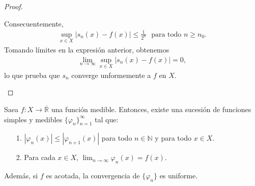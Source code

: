 \begin{proof}
\begin{enumerate}
              Consecuentemente,
              \begin{align*}
                  \sup_{x \in X}{|s_n(x) - f(x)|} \leq \frac{1}{2^n} \ \ \ \text{para todo } n \ge n_0.
              \end{align*}
              Tomando límites en la expresión anterior, obtenemos
              \begin{align*}
                  \lim_{n \to \infty}{\sup_{x \in X}{|s_n(x) - f(x)|}} = 0,
              \end{align*}
              lo que prueba que $s_n$ converge unformemente a $f$ en $X$.
    \end{enumerate}
\end{proof}

\begin{cor}
    Saea $f : X \longrightarrow \overline{\mathbb{R}}$ una función medible. Entonces, existe una sucesión de funciones simples y medibles $\{ \varphi_n\}_{n=1}^{\infty}$ tal que:
    \begin{enumerate}
        \item[1.] $|\varphi_n(x)| \leq |\varphi_{n+1}(x)|$ para todo $n \in \mathbb{N}$ y para todo $x \in X$.
        \item[2.] Para cada $x \in X$, $\lim_{n \to \infty}{\varphi_n(x)} = f(x)$.
    \end{enumerate}
    Además, si $f$ es acotada, la convergencia de $\{\varphi_n\}$ es uniforme.
\end{cor}

